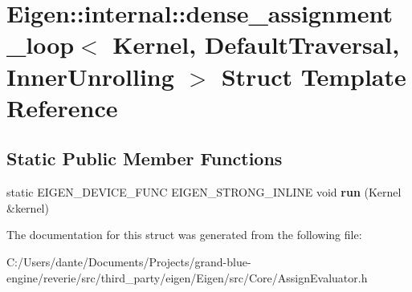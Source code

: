 \hypertarget{struct_eigen_1_1internal_1_1dense__assignment__loop_3_01_kernel_00_01_default_traversal_00_01_inner_unrolling_01_4}{}\section{Eigen\+::internal\+::dense\+\_\+assignment\+\_\+loop$<$ Kernel, Default\+Traversal, Inner\+Unrolling $>$ Struct Template Reference}
\label{struct_eigen_1_1internal_1_1dense__assignment__loop_3_01_kernel_00_01_default_traversal_00_01_inner_unrolling_01_4}
\subsection*{Static Public Member Functions}
\begin{DoxyCompactItemize}
\item 
\mbox{\label{struct_eigen_1_1internal_1_1dense__assignment__loop_3_01_kernel_00_01_default_traversal_00_01_inner_unrolling_01_4_a02ff3628c48eb236d79bf69c05791a49}} 
static E\+I\+G\+E\+N\+\_\+\+D\+E\+V\+I\+C\+E\+\_\+\+F\+U\+NC E\+I\+G\+E\+N\+\_\+\+S\+T\+R\+O\+N\+G\+\_\+\+I\+N\+L\+I\+NE void {\bfseries run} (Kernel \&kernel)
\end{DoxyCompactItemize}


The documentation for this struct was generated from the following file\+:\begin{DoxyCompactItemize}
\item 
C\+:/\+Users/dante/\+Documents/\+Projects/grand-\/blue-\/engine/reverie/src/third\+\_\+party/eigen/\+Eigen/src/\+Core/Assign\+Evaluator.\+h\end{DoxyCompactItemize}
